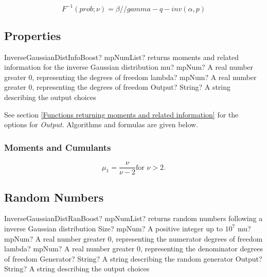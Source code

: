 \begin{equation} 
	F^{-1}(prob;\nu)= \beta / / gamma-q-inv(\alpha, p)
\end{equation}



\subsection{Properties}
\label{InverseGaussianDistributionProperties}

\begin{mpFunctionsExtract}
	\mpFunctionThree
	{InverseGaussianDistInfoBoost? mpNumList? returns moments and related information for the inverse Gaussian distribution}
	{mu? mpNum? A real number greater 0, representing the degrees of freedom}
	{lambda? mpNum? A real number greater 0, representing the degrees of freedom}
	{Output? String? A string describing the output choices}
\end{mpFunctionsExtract}

\vspace{0.3cm}

See section \ref{Functions returning moments and related information} for the options for {\itshape\sffamily Output}. Algorithms and formulas are given below.

\subsubsection{Moments and Cumulants}
\begin{equation} 
	\mu_1 = \frac{\nu}{\nu-2} \text{for } \nu>2.
\end{equation}





\subsection{Random Numbers}

\begin{mpFunctionsExtract}
	\mpFunctionFive
	{InverseGaussianDistRanBoost? mpNumList? returns random numbers following a inverse Gaussian distribution}
	{Size? mpNum? A positive integer up to $10^7$}
	{mu? mpNum? A real number greater 0, representing the numerator  degrees of freedom}
	{lambda? mpNum? A real number greater 0, representing the denominator degrees of freedom}
	{Generator? String? A string describing the random generator}
	{Output? String? A string describing the output choices}
\end{mpFunctionsExtract}


